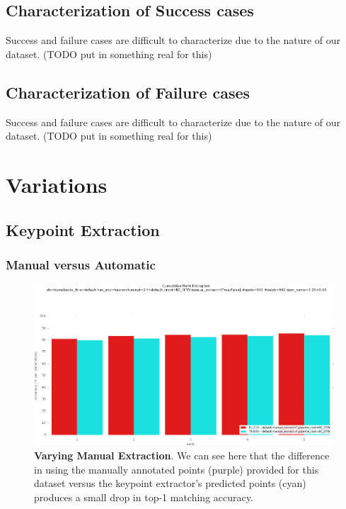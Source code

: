 \subsection{Characterization of Success cases}

Success and failure cases are difficult to characterize due to the nature of our dataset.  (TODO put in something real for this)

\subsection{Characterization of Failure cases}

Success and failure cases are difficult to characterize due to the nature of our dataset.  (TODO put in something real for this)

\section{Variations}

\subsection{Keypoint Extraction}

\subsubsection{Manual versus Automatic}


\begin{figure}[t]%
\centering
\includegraphics[width=1\textwidth]{../images/results/vary_manual_extract.png}
\caption[]{\textbf{Varying Manual Extraction}. We can see here that the difference in using the manually annotated points (purple) provided for this dataset versus the keypoint extractor's predicted points (cyan) produces a small drop in top-1 matching accuracy.}
\label{fig:vary_manual_extract}
\end{figure}

